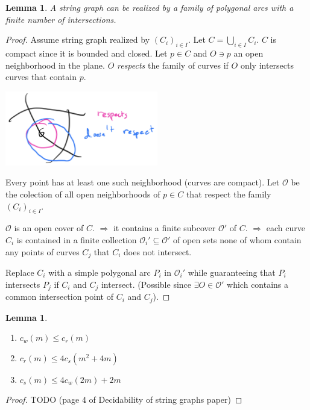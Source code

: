 \documentclass[12pt]{article}
\theoremstyle{plain} %
\newtheorem{lemma}[theorem]{Lemma}
\begin{document}
\begin{lemma}
A string graph can be realized by a family of polygonal arcs with a finite number of intersections.
\end{lemma}

\begin{proof}
Assume string graph realized by \( (C_i)_{i\in I} \). Let \(C = \bigcup_{i\in I} C_i\).
\(C\) is compact since it is bounded and closed. Let \(p \in C\) and \(O \ni p\) an open neighborhood 
in the plane. \(O\) \textit{respects} the family of curves if \(O\) only intersects curves that contain \(p\).

\includegraphics[width=0.5\textwidth]{images/figure-1.jpeg}

Every point has at least one such neighborhood (curves are compact). 
Let \(\mathcal{O}\) be the colection of all open neighborhoods of \(p\in C\) that respect 
the family \((C_i)_{i\in I}\). 

\(\mathcal{O}\) is an open cover of \(C\). \(\Rightarrow\) it contains a finite subcover 
\(\mathcal{O}'\) of \(C\). \(\Rightarrow\) each curve \(C_i\) is contained 
in a finite collection \(\mathcal{O}_i' \subseteq \mathcal{O}'\) of open sets
none of whom contain any points of curves \(C_j\) that \(C_i\) does not intersect. 

Replace \(C_i\) with a simple polygonal arc \(P_i\) in \(\mathcal{O}_i'\) 
while guaranteeing that \(P_i\) intersects \(P_j\) if \(C_i\) and \(C_j\) intersect.
(Possible since \(\exists O \in \mathcal{O}'\) which contains a common intersection point of \(C_i\) and \(C_j\)).
\end{proof}

\begin{lemma}
\begin{enumerate}
    \item \(c_w(m) \leq c_r(m)\)
    \item \( c_r(m) \leq 4 c_s(m^2 + 4m) \)
    \item \(c_s(m) \leq 4 c_w(2m) + 2m\)
\end{enumerate}
\end{lemma}

\begin{proof}
    TODO (page 4 of Decidability of string graphs paper)
\end{proof}
\end{document}
